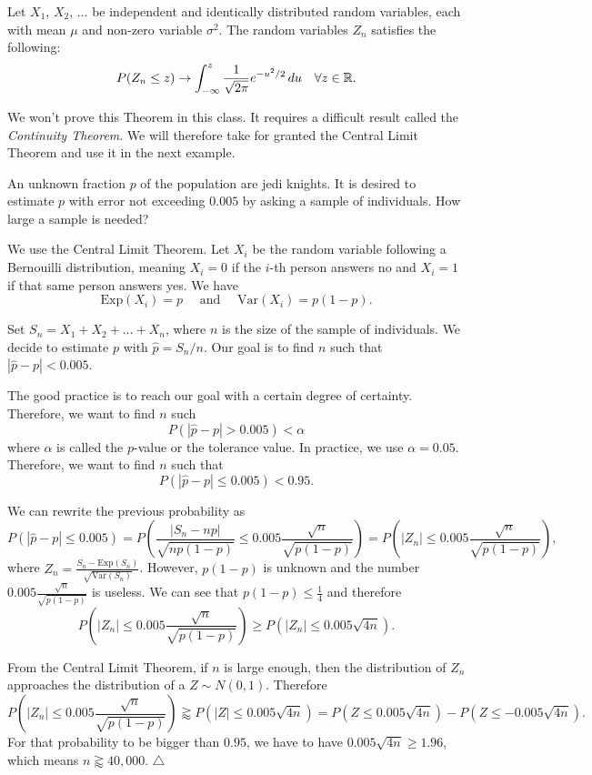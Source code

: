 \begin{theorem}
Let $X_1$, $X_2$, $\ldots$ be independent and identically distributed random variables, each with mean $\mu$ and non-zero variable $\sigma^2$. The random variables $Z_n$ satisfies the following:
    \[
        P (Z_n \leq z ) \rightarrow \int_{-\infty}^z \frac{1}{\sqrt{2\pi}} e^{-u^2/2} \, du \quad \forall z \in \mathbb{R} .
    \]
\end{theorem}

We won't prove this Theorem in this class. It requires a difficult result called the \textit{Continuity Theorem}. We will therefore take for granted the Central Limit Theorem and use it in the next example.

\begin{example}
An unknown fraction $p$ of the population are jedi knights. It is desired to estimate $p$ with error not exceeding $0.005$ by asking a sample of individuals. How large a sample is needed?
\end{example}

\begin{sol*}
We use the Central Limit Theorem. Let $X_i$ be the random variable following a Bernouilli distribution, meaning $X_i = 0$ if the $i$-th person answers no and $X_i = 1$ if that same person answers yes. We have 
    \[
        \mathrm{Exp} (X_i) = p \quad \text{ and } \quad \mathrm{Var} (X_i) = p (1 - p) .
    \]

Set $S_n = X_1 + X_2 + \ldots + X_n$, where $n$ is the size of the sample of individuals. We decide to estimate $p$ with $\hat{p} = S_n /n$. Our goal is to find $n$ such that $|\hat{p} - p| < 0.005$.

The good practice is to reach our goal with a certain degree of certainty. Therefore, we want to find $n$ such 
    \[
        P ( |\hat{p} - p| > 0.005 ) < \alpha 
    \]
where $\alpha$ is called the $p$-value or the tolerance value. In practice, we use $\alpha = 0.05$. Therefore, we want to find $n$ such that 
    \[
        P (| \hat{p} - p | \leq 0.005 ) < 0.95 .
    \]

We can rewrite the previous probability as
    \[
        P (|\hat{p} - p| \leq 0.005 ) = P \left( \frac{|S_n - n p|}{\sqrt{n p (1 - p)}} \leq 0.005\frac{\sqrt{n}}{\sqrt{p (1 - p)}} \right) = P \left( |Z_n| \leq 0.005 \frac{\sqrt{n}}{\sqrt{p (1 - p)}} \right) ,
    \]
where $Z_n = \frac{S_n - \mathrm{Exp} (S_n)}{\sqrt{\mathrm{Var} (S_n)}}$. However, $p (1 - p)$ is unknown and the number $0.005 \frac{\sqrt{n}}{\sqrt{p (1 - p)}}$ is useless. We can see that $p (1 - p) \leq \frac{1}{4}$ and therefore
    \[
        P \left( |Z_n| \leq 0.005 \frac{\sqrt{n}}{\sqrt{p (1 - p)}} \right) \geq P (|Z_n| \leq 0.005 \sqrt{4n} ) .
    \]

From the Central Limit Theorem, if $n$ is large enough, then the distribution of $Z_n$ approaches the distribution of a $Z \sim N (0, 1)$.  Therefore
    \[ 
        P \left( |Z_n| \leq 0.005 \frac{\sqrt{n}}{\sqrt{p (1 - p)}} \right) \gtrapprox P (|Z| \leq 0.005 \sqrt{4n} ) = P (Z \leq 0.005 \sqrt{4n} ) - P (Z \leq -0.005 \sqrt{4n} ) .
    \]
For that probability to be bigger than $0.95$, we have to have $0.005 \sqrt{4n} \geq 1.96$, which means $n \gtrapprox 40,000$. \hfill $\triangle$
\end{sol*}


